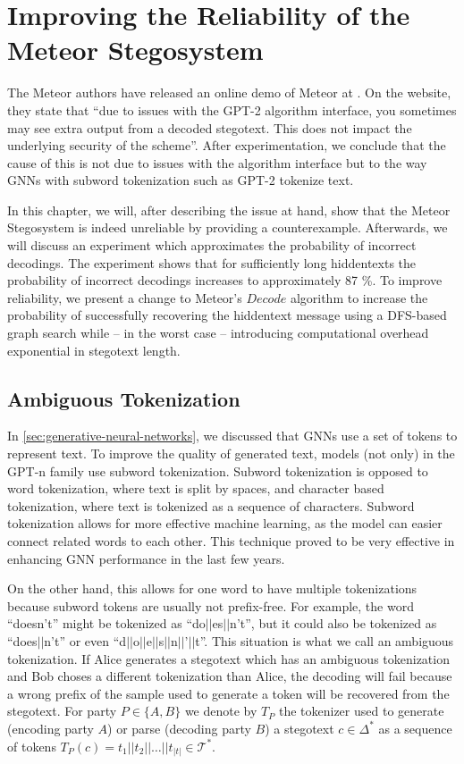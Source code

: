 \chapter{Improving the Reliability of the Meteor Stegosystem}
\label{chap:reliability}

The Meteor authors have released an online demo of Meteor at \cite{MeteorDemo2021}.
On the website, they state that ``due to issues with the GPT-2 algorithm interface, you sometimes may see extra output from a decoded stegotext. This does not impact the underlying security of the scheme''.
After experimentation, we conclude that the cause of this is not due to issues with the algorithm interface but to the way GNNs with subword tokenization such as GPT-2 tokenize text.

In this chapter, we will, after describing the issue at hand, show that the Meteor Stegosystem is indeed unreliable by providing a counterexample.
Afterwards, we will discuss an experiment which approximates the probability of incorrect decodings.
The experiment shows that for sufficiently long hiddentexts the probability of incorrect decodings increases to approximately 87 \%.
To improve reliability, we present a change to Meteor's $Decode$ algorithm to increase the probability of successfully recovering the hiddentext message using a DFS-based graph search while -- in the worst case -- introducing computational overhead exponential in stegotext length.

\section{Ambiguous Tokenization}
\label{sec:amb-tok}

In \autoref{sec:generative-neural-networks}, we discussed that GNNs use a set of tokens to represent text.
To improve the quality of generated text, models (not only) in the GPT-n family use subword tokenization.
Subword tokenization is opposed to word tokenization, where text is split by spaces, and character based tokenization, where text is tokenized as a sequence of characters.
Subword tokenization allows for more effective machine learning, as the model can easier connect related words to each other.
This technique proved to be very effective in enhancing GNN performance in the last few years.

On the other hand, this allows for one word to have multiple tokenizations because subword tokens are usually not prefix-free.
For example, the word ``doesn't'' might be tokenized as ``do$||$es$||$n't'', but it could also be tokenized as ``does$||$n't'' or even ``d$||$o$||$e$||$s$||$n$||$'$||$t''.
This situation is what we call an ambiguous tokenization.
If Alice generates a stegotext which has an ambiguous tokenization and Bob choses a different tokenization than Alice, the decoding will fail because a wrong prefix of the sample used to generate a token will be recovered from the stegotext.
For party $P \in \{A,B\}$ we denote by $T_P$ the tokenizer used to generate (encoding party $A$) or parse (decoding party $B$) a stegotext $c \in \Delta^*$ as a sequence of tokens $T_P(c) = t_1||t_2||\dots||t_{|t|} \in \mathcal{T}^*$.

